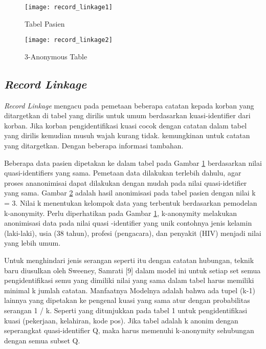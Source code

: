 \begin{figure}[H]
	\centering
	\texttt{[image: record\_linkage1]}
	\caption{Tabel Pasien}
	\label{fig:record_linkage1}
\end{figure} 

\begin{figure}[H]
	\centering
	\texttt{[image: record\_linkage2]}
	\caption{3-Anonymous Table}
	\label{fig:record_linkage2}
\end{figure} 

\subsection{\textit{Record Linkage}}
\textit{Record Linkage} mengacu pada pemetaan beberapa catatan kepada korban yang ditargetkan di tabel yang dirilis untuk umum berdasarkan kuasi-identifier dari korban. Jika korban pengidentifikasi kuasi cocok dengan catatan dalam tabel yang dirilis kemudian musuh wajah kurang tidak. kemungkinan untuk catatan yang ditargetkan. Dengan beberapa informasi tambahan. 

\par Beberapa data pasien dipetakan ke dalam tabel pada Gambar \ref{fig:record_linkage1} berdasarkan nilai quasi-identifiers yang sama. Pemetaan data dilakukan terlebih dahulu, agar proses ananonimisai dapat dilakukan dengan mudah pada nilai quasi-idetifier yang sama. Gambar \ref{fig:record_linkage2} adalah hasil anonimisasi pada tabel pasien dengan nilai k = 3. Nilai k menentukan kelompok data yang terbentuk berdasarkan pemodelan k-anonymity. Perlu diperhatikan pada Gambar \ref{fig:record_linkage1}, k-anonymity melakukan anonimisasi data pada nilai quasi -identifier yang unik contohnya jenis kelamin (laki-laki), usia (38 tahun), profesi (pengacara), dan penyakit (HIV) menjadi nilai yang lebih umum.

\par Untuk menghindari jenis serangan seperti itu dengan catatan hubungan, teknik baru diusulkan oleh Sweeney, Samrati [9] dalam model ini untuk setiap set semua pengidentifikasi semu yang dimiliki nilai yang sama dalam tabel harus memiliki minimal k jumlah catatan. Manfaatnya Modelnya adalah bahwa ada tupel (k-1) lainnya yang dipetakan ke pengenal kuasi yang sama atur dengan probabilitas serangan 1 / k. Seperti yang ditunjukkan pada tabel 1 untuk pengidentifikasi kuasi (pekerjaan, kelahiran, kode pos). Jika tabel adalah k anonim dengan seperangkat quasi-identifier Q, maka harus memenuhi k-anonymity sehubungan dengan semua subset Q.

